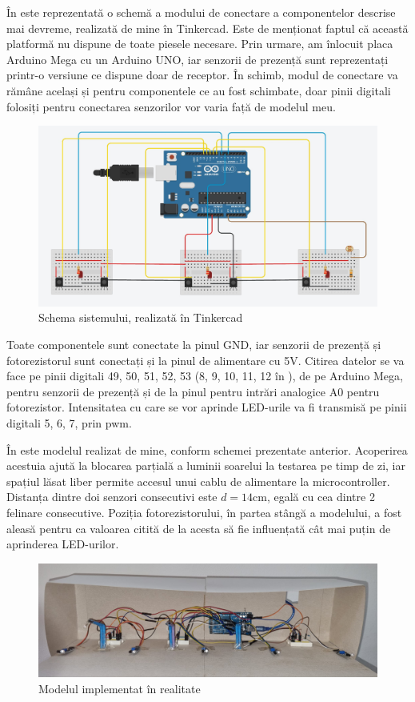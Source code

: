 În  este reprezentată o schemă a modului de conectare a componentelor descrise mai devreme, realizată de mine în Tinkercad. Este de menționat faptul că această platformă nu dispune de toate piesele necesare. Prin urmare, am înlocuit placa Arduino Mega cu un Arduino UNO, iar senzorii de prezență sunt reprezentați printr-o versiune ce dispune doar de receptor. În schimb, modul de conectare va rămâne același și pentru componentele ce au fost schimbate, doar pinii digitali folosiți pentru conectarea senzorilor vor varia față de modelul meu.

\begin{figure}[!ht]
    \begin{center}
    \includegraphics[width=\linewidth,keepaspectratio]{pics/Schema_Arduino.jpg}
    \end{center}
    \caption{Schema sistemului, realizată în Tinkercad}
    \label{fig:arduino}
\end{figure}


Toate componentele sunt conectate la pinul GND, iar senzorii de prezență și fotorezistorul sunt conectați și la pinul de alimentare cu 5V. Citirea datelor se va face pe pinii digitali 49, 50, 51, 52, 53 (8, 9, 10, 11, 12 în ), de pe Arduino Mega, pentru senzorii de prezență și de la pinul pentru intrări analogice A0 pentru fotorezistor. Intensitatea cu care se vor aprinde LED-urile va fi transmisă pe pinii digitali 5, 6, 7, prin \gls{pwm}.

În  este modelul realizat de mine, conform schemei prezentate anterior. Acoperirea   acestuia ajută la blocarea parțială a luminii soarelui la testarea pe timp de zi, iar spațiul lăsat liber permite accesul unui cablu de alimentare la microcontroller. Distanța dintre doi senzori consecutivi este $d=14$cm, egală cu cea dintre 2 felinare consecutive. Poziția fotorezistorului, în partea stângă a modelului, a fost aleasă pentru ca valoarea citită de la acesta să fie influențată cât mai puțin de aprinderea LED-urilor.

\begin{figure}[!ht]
    \begin{center}
    \includegraphics[width=\linewidth,keepaspectratio]{pics/sistemirl.jpeg}
    \end{center}
    \caption{Modelul implementat în realitate}
    \label{fig:model}
\end{figure}